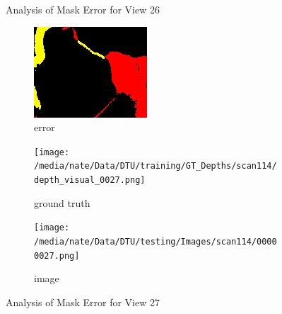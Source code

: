 \documentclass{article}
\begin{document}
\begin{figure}
\begin{subfigure}{0.3\textwidth}
		\label{fig:img26}
	\end{subfigure}
	\hfill
	\caption{Analysis of Mask Error for View 26}
	\label{fig:error_analys26}
\end{figure}\begin{figure}
	\centering
	\begin{subfigure}{0.3\textwidth}
		\centering
		\includegraphics[width=\textwidth]{./output/027_error.png}
		\caption{error}
		\label{fig:error27}
	\end{subfigure}
	\hfill
	\centering
	\begin{subfigure}{0.3\textwidth}
		\centering
		\texttt{[image: /media/nate/Data/DTU/training/GT\_Depths/scan114/depth\_visual\_0027.png]}
		\caption{ground truth}
		\label{fig:gt27}
	\end{subfigure}
	\hfill
	\centering
	\begin{subfigure}{0.3\textwidth}
		\centering
		\texttt{[image: /media/nate/Data/DTU/testing/Images/scan114/00000027.png]}
		\caption{image}
		\label{fig:img27}
	\end{subfigure}
	\hfill
	\caption{Analysis of Mask Error for View 27}
	\label{fig:error_analys27}
\end{figure}\begin{figure}
	\centering
	\begin{subfigure}{0.3\textwidth}
		\centering

\end{subfigure}
\end{figure}
\end{document}

